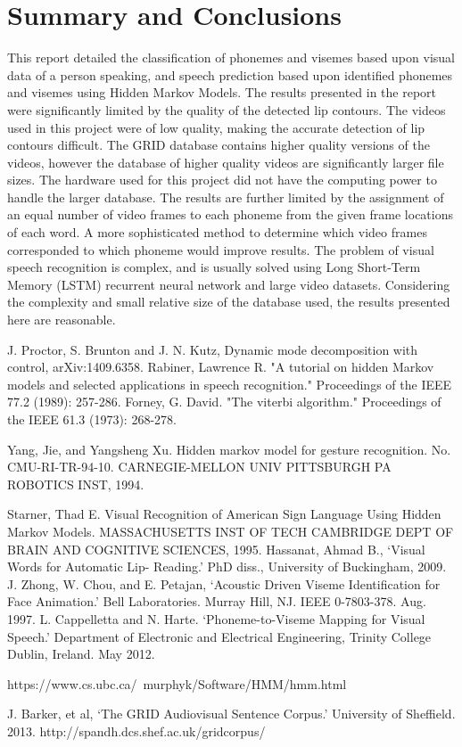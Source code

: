 \documentclass[a4paper,11pt]{article}
\begin{document}
\section{Summary and Conclusions}

This report detailed the classification of phonemes and visemes based upon visual data of a person speaking, and speech prediction based upon identified phonemes and visemes using Hidden Markov Models.  The results presented in the report were significantly limited by the quality of the detected lip contours.  The videos used in this project were of low quality, making the accurate detection of lip contours difficult.  The GRID database contains higher quality versions of the videos, however the database of higher quality videos are significantly larger file sizes.  The hardware used for this project did not have the computing power to handle the larger database.  The results are further limited by the assignment of an equal number of video frames to each phoneme from the given frame locations of each word.  A more sophisticated method to determine which video frames corresponded to which phoneme would improve results.  The problem of visual speech recognition is complex, and is usually solved using Long Short-Term Memory (LSTM) recurrent neural network and large video datasets.  Considering the complexity and small relative size of the database used, the results presented here are reasonable.  


\newpage
\begin{thebibliography}{1}
	J. Proctor, S. Brunton and J. N. Kutz, Dynamic mode decomposition with control, arXiv:1409.6358.
	Rabiner, Lawrence R. "A tutorial on hidden Markov models and selected applications in speech recognition." Proceedings of the IEEE 77.2 (1989): 257-286.	
	Forney, G. David. "The viterbi algorithm." Proceedings of the IEEE 61.3 (1973): 268-278.
	
	Yang, Jie, and Yangsheng Xu. Hidden markov model for gesture recognition. No. CMU-RI-TR-94-10. CARNEGIE-MELLON UNIV PITTSBURGH PA ROBOTICS INST, 1994.

	Starner, Thad E. Visual Recognition of American Sign Language Using Hidden Markov Models. MASSACHUSETTS INST OF TECH CAMBRIDGE DEPT OF BRAIN AND COGNITIVE SCIENCES, 1995.
	Hassanat, Ahmad B., `Visual Words for Automatic Lip- Reading.' PhD diss., University of Buckingham, 2009.
	J. Zhong, W. Chou, and E. Petajan, `Acoustic Driven Viseme Identification for Face Animation.' Bell Laboratories. Murray Hill, NJ. IEEE 0-7803-378. Aug. 1997.
	L. Cappelletta and N. Harte. `Phoneme-to-Viseme Mapping for Visual Speech.' Department of Electronic and Electrical Engineering, Trinity College Dublin, Ireland. May 2012.
	
	 https://www.cs.ubc.ca/~murphyk/Software/HMM/hmm.html
	
	 J. Barker, et al, `The GRID Audiovisual Sentence Corpus.' University of Sheffield. 2013. http://spandh.dcs.shef.ac.uk/gridcorpus/

\end{thebibliography}
\end{document}
